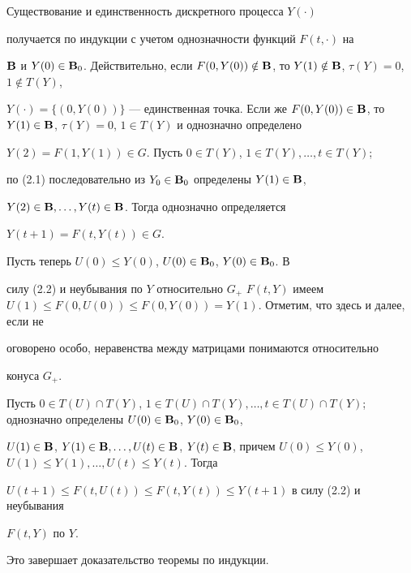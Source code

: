 \begin{pf}


Существование и единственность дискретного процесса $Y(\cdot)$


получается по индукции с учетом однозначности функций $F(t,\cdot)$ на


$\bold B$ и $Y(0)\in\bold B_0$. Действительно, если $F(0,Y(0))\notin\bold


B$, то $Y(1)\notin\bold B$, $\tau(Y)=0$, $1\notin T(Y)$,


$Y(\cdot)=\{(0,Y(0))\}$ --- единственная точка. Если же $F(0,Y(0))\in\bold


B$, то $Y(1)\in\bold B$, $\tau(Y)=0$, $1\in T(Y)$ и однозначно определено


$Y(2){=}F(1,Y(1)){\in} G$. Пусть $0\in T(Y)$, $1\in T(Y),\dotsc, t\in T(Y)$;


по (2.1) последовательно из $Y_0\in\bold B_0$ определены $Y(1)\in\bold B$,


$Y(2)\in\bold B,\dotsc,Y(t)\in\bold B$. Тогда однозначно определяется


$Y(t+1)=F(t,Y(t))\in G$.





Пусть теперь $U(0)\le Y(0)$, $U(0)\in\bold B_0$, $Y(0)\in\bold B_0$. В


силу (2.2) и неубывания по $Y$ относительно $G_+$ $F(t,Y)$ имеем $U(1)\le


F(0,U(0))\le F(0,Y(0))=Y(1)$. Отметим, что здесь и далее, если не


оговорено особо, неравенства между матрицами понимаются относительно


конуса $G_+$.





Пусть $0\in T(U)\cap T(Y)$, $1\in T(U)\cap T(Y),\dotsc,t\in T(U)\cap


T(Y)$; однозначно определены $U(0)\in\bold B_0$, $Y(0)\in\bold B_0$,


$U(1)\in\bold B$, $Y(1)\in\bold B,\dotsc,U(t)\in\bold B$, $Y(t)\in\bold


B$, причем $U(0)\le Y(0)$, $U(1)\le Y(1),\dotsc,U(t)\le Y(t)$. Тогда


$U(t+1)\le F(t,U(t))\le F(t,Y(t))\le Y(t+1)$ в силу (2.2) и неубывания


$F(t,Y)$ по $Y$.


Это завершает доказательство теоремы по индукции.


\end{pf}





